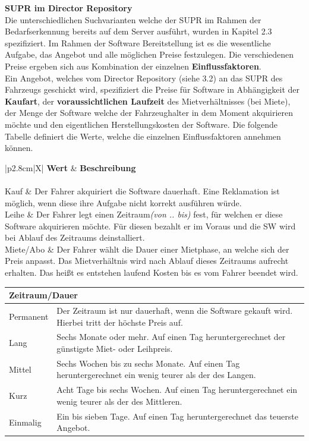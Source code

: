 \textbf{SUPR im Director Repository}\\
Die unterschiedlichen Suchvarianten welche der SUPR im Rahmen der Bedarfserkennung bereits auf dem Server ausführt, wurden in Kapitel 2.3 spezifiziert. Im Rahmen der Software Bereitstellung ist es die wesentliche Aufgabe, das Angebot und alle möglichen Preise festzulegen. Die verschiedenen Preise ergeben sich aus Kombination der einzelnen \textbf{Einflussfaktoren}.\\
Ein Angebot, welches vom Director Repository (siehe 3.2) an das SUPR des Fahrzeugs geschickt wird, spezifiziert die Preise für Software in Abhängigkeit der \textbf{Kaufart}, der \textbf{voraussichtlichen Laufzeit} des Mietverhältnisses (bei Miete), der Menge der Software welche der Fahrzeughalter in dem Moment akquirieren möchte und den eigentlichen Herstellungskosten der Software. Die folgende Tabelle definiert die Werte, welche die einzelnen Einflussfaktoren annehmen können.\\
\begin{center}
	\begin{tabularx}{\linewidth}{|p{2.8cm}|X|}
		\hline
		\textbf{Wert} & \textbf{Beschreibung}\\ [0.5ex] 
		\hline\hline
		\multicolumn{2}{|l|}{\textbf{Kaufart}}\\
		\hline
		Kauf & Der Fahrer akquiriert die Software dauerhaft. Eine Reklamation ist möglich, wenn diese ihre Aufgabe nicht korrekt ausführen würde.\\
		\hline
		Leihe & Der Fahrer legt einen Zeitraum\textit{(von .. bis)} fest, für welchen er diese Software akquirieren möchte. Für diesen bezahlt er im Voraus und die SW wird bei Ablauf des Zeitraums deinstalliert.\\
		\hline
		Miete/Abo & Der Fahrer wählt die Dauer einer Mietphase, an welche sich der Preis anpasst. Das Mietverhältnis wird nach Ablauf dieses Zeitraums aufrecht erhalten. Das heißt es entstehen laufend Kosten bis es vom Fahrer beendet wird.\\
		\hline
	\end{tabularx}
\end{center}
\begin{center}
	\begin{tabularx}{\linewidth}{|p{2.8cm}|X|}
		\hline
		\multicolumn{2}{|l|}{\textbf{Zeitraum/Dauer}}\\
		\hline
		Permanent & Der Zeitraum ist nur dauerhaft, wenn die Software gekauft wird. Hierbei tritt der höchste Preis auf.\\
		\hline
		Lang & Sechs Monate oder mehr. Auf einen Tag heruntergerechnet der günstigste Miet- oder Leihpreis.\\
		\hline
		Mittel & Sechs Wochen bis zu sechs Monate. Auf einen Tag heruntergerechnet ein wenig teurer als der des Langen.\\
		\hline
		Kurz & Acht Tage bis sechs Wochen. Auf einen Tag heruntergerechnet ein wenig teurer als der des Mittleren.\\
		\hline
		Einmalig & Ein bis sieben Tage. Auf einen Tag heruntergerechnet das teuerste Angebot.\\[0.5ex]
		\hline
	\end{tabularx}
\end{center}
